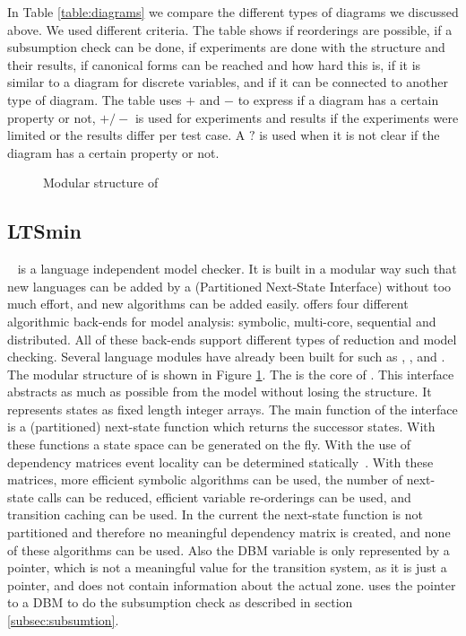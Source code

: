 In Table \ref{table:diagrams} we compare the different types of diagrams we discussed above. We used different criteria. The table shows if reorderings are possible, if a subsumption check can be done, if experiments are done with the structure and their results, if canonical forms can be reached and how hard this is, if it is similar to a diagram for discrete variables, and if it can be connected to another type of diagram. The table uses $+$ and $-$ to express if a diagram has a certain property or not, $+/-$ is used for experiments and results if the experiments were limited or the results differ per test case. A $?$ is used when it is not clear if the diagram has a certain property or not. 

\begin{figure}[h] 

\caption{Modular structure of \ltsmin{}~\cite{eemcs18152}}
\label{fig:pins_modern}
\end{figure}

\subsection{LTSmin}
\ltsmin{}~\cite{eemcs18152,ltsmin-mc:nmf2011} is a language independent model checker. It is built in a modular way such that new languages can be added by a \pins{} (Partitioned Next-State Interface) without too much effort, and new algorithms can be added easily. \ltsmin{} offers four different algorithmic back-ends for model analysis: symbolic, multi-core, sequential and distributed. All of these back-ends support different types of reduction and model checking. Several language modules have already been built for \ltsmin{} such as \mcrl{}, \promela{}, \dve{} and \uppaal{}. The modular structure of \ltsmin{} is shown in Figure \ref{fig:pins_modern}. The \pins{} is the core of \ltsmin{}. This interface abstracts as much as possible from the model without losing the structure. It represents states as fixed length integer arrays. The main function of the interface is a (partitioned) next-state function which returns the successor states. With these functions a state space can be generated on the fly. With the use of dependency matrices event locality can be determined statically~\cite{rwcmatrices}. With these matrices, more efficient symbolic algorithms can be used, the number of next-state calls can be reduced, efficient variable re-orderings can be used, and transition caching can be used. In the current \uppaal{} \pins{} the next-state function is not partitioned and therefore no meaningful dependency matrix is created, and none of these algorithms can be used. Also the DBM variable is only represented by a pointer, which is not a meaningful value for the transition system, as it is just a pointer, and does not contain information about the actual zone. \ltsmin{} uses the pointer to a DBM to do the subsumption check as described in section \ref{subsec:subsumtion}.

